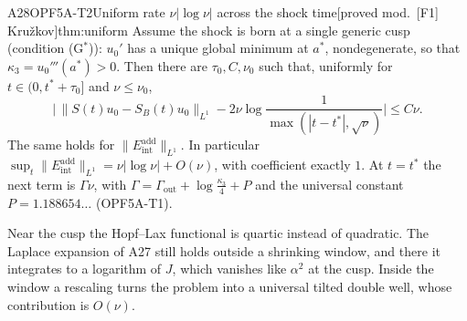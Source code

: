\documentclass[11pt,a4paper,oneside]{report}
\newcommand{\badge}[2]{\textcolor{#1}{\textsf{\footnotesize[#2]}}}
\newcommand{\modulo}[1]{\badge{cD}{proved mod.\ #1}}
\newcommand{\led}[1]{\textcolor{cG}{\textsf{\footnotesize(#1)}}}
\newcommand{\Eint}{E_{\mathrm{int}}}
\newenvironment{dimcard}[5]{\par\Needspace{12\baselineskip}\begin{dimcardbox}{#1}{#2}{#3}{#4}{#5}}{\end{dimcardbox}}
\begin{document}
\begin{dimcard}{A28}{OPF5A-T2}{Uniform rate $\nu|\log\nu|$ across the shock time}{\modulo{[F1] Kru\v zkov}}{thm:uniform}
\label{dim:OPF5A-T1}%
Assume the shock is born at a single generic cusp (condition (G$^*$)): $u_0'$ has a unique global minimum at $a^*$, nondegenerate, so that $\kappa_3=u_0'''(a^*)>0$. Then there are $\tau_0,C,\nu_0$ such that, uniformly for $t\in(0,t^*+\tau_0]$ and $\nu\le\nu_0$,
\[
\Big|\,\|S(t)u_0-S_B(t)u_0\|_{L^1}-2\nu\log\frac{1}{\max(|t-t^*|,\sqrt\nu)}\Big|\le C\nu .
\]
The same holds for $\|\Eint^{\mathrm{add}}\|_{L^1}$. In particular $\sup_t\|\Eint^{\mathrm{add}}\|_{L^1}=\nu|\log\nu|+O(\nu)$, with coefficient exactly $1$. At $t=t^*$ the next term is $\Gamma\nu$, with $\Gamma=\Gamma_{\mathrm{out}}+\log\frac{\kappa_3}{4}+P$ and the universal constant $P=1.188654\ldots$ \led{OPF5A-T1}.
\end{dimcard}

\begin{proofidea}
Near the cusp the Hopf--Lax functional is quartic instead of quadratic. The Laplace expansion of A27 still holds outside a shrinking window, and there it integrates to a logarithm of $J$, which vanishes like $\alpha^2$ at the cusp. Inside the window a rescaling turns the problem into a universal tilted double well, whose contribution is $O(\nu)$.
\end{proofidea}
\end{document}
